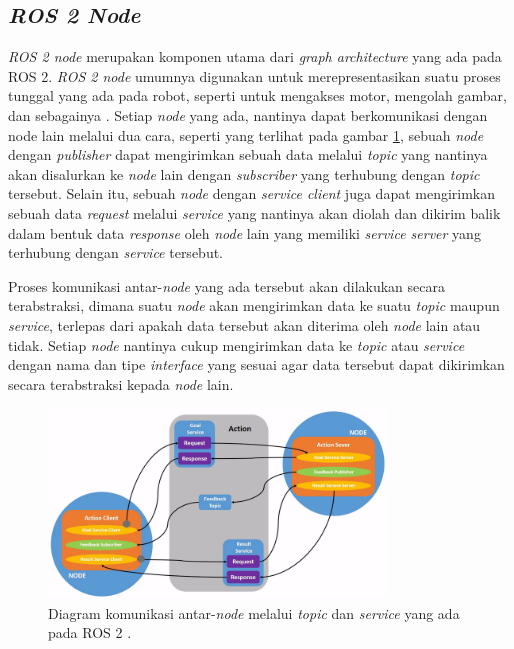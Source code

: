 \subsection{\emph{ROS 2 Node}}
\label{subsec:ros2node}

\emph{ROS 2 node} merupakan komponen utama dari \emph{graph architecture} yang ada pada ROS 2.
\emph{ROS 2 node} umumnya digunakan untuk merepresentasikan suatu proses tunggal yang ada pada robot,
  seperti untuk mengakses motor, mengolah gambar, dan sebagainya \citep{url:understandingros2nodes}.
Setiap \emph{node} yang ada, nantinya dapat berkomunikasi dengan node lain melalui dua cara,
  seperti yang terlihat pada gambar \ref{fig:diagramnoderos2},
  sebuah \emph{node} dengan \emph{publisher} dapat mengirimkan sebuah data melalui \emph{topic} yang nantinya akan disalurkan ke \emph{node} lain dengan \emph{subscriber} yang terhubung dengan \emph{topic} tersebut.
Selain itu, sebuah \emph{node} dengan \emph{service client} juga dapat mengirimkan sebuah data \emph{request} melalui \emph{service} yang nantinya akan diolah dan dikirim balik dalam bentuk data \emph{response} oleh \emph{node} lain yang memiliki \emph{service server} yang terhubung dengan \emph{service} tersebut.

Proses komunikasi antar-\emph{node} yang ada tersebut akan dilakukan secara terabstraksi,
  dimana suatu \emph{node} akan mengirimkan data ke suatu \emph{topic} maupun \emph{service},
  terlepas dari apakah data tersebut akan diterima oleh \emph{node} lain atau tidak.
Setiap \emph{node} nantinya cukup mengirimkan data ke \emph{topic} atau \emph{service} dengan nama dan tipe \emph{interface} yang sesuai agar data tersebut dapat dikirimkan secara terabstraksi kepada \emph{node} lain.

\begin{figure}
  \centering
  \includegraphics[width=0.8\textwidth,keepaspectratio]{gambar/diagram-node-ros2.png}
  \caption{Diagram komunikasi antar-\emph{node} melalui \emph{topic} dan \emph{service} yang ada pada ROS 2 \citep{url:understandingros2nodes}.}
  \label{fig:diagramnoderos2}
\end{figure}

